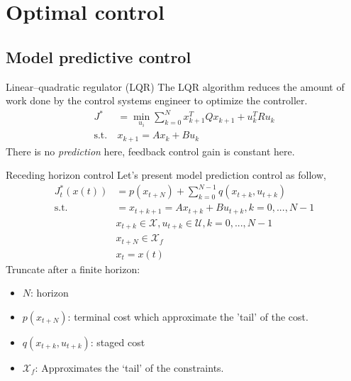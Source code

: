 \documentclass{beamer}
\begin{document}
\section{Optimal control}
\subsection{Model predictive control}
\begin{frame}{Linear–quadratic regulator (LQR)}
	The LQR algorithm reduces the amount of work done by the control systems engineer to optimize the controller.
	\begin{align*}
		J^* &= \min_{u_i} \sum_{k = 0}^{N} x_{k+1}^T Q x_{k+1} + u_k^T R u_k \\
		\text{s.t.} \ & x_{k+1} = A x_{k} + B u_{k}
	\end{align*}
	There is no \emph{prediction} here, feedback control gain is constant here.
\end{frame}


\begin{frame}{Receding horizon control}
	Let's present model prediction control as follow,
	\begin{align*}
		J_t^*(x(t)) &= p(x_{t+N}) + \sum_{k = 0}^{N-1} q(x_{t+k}, u_{t+k}) \\
		\text{s.t.} &= x_{t+k+1} = A x_{t+k} + B u_{t+k}, k = 0,...,N-1 \\
		& x_{t+k} \in \mathcal{X}, u_{t+k} \in \mathcal{U}, k = 0,...,N-1 \\
		& x_{t+N} \in \mathcal{X}_f \\
		& x_t = x(t)
	\end{align*}
	Truncate after a finite horizon:
	\begin{itemize}
		\item $N$: horizon
		\item $p(x_{t+N})$: terminal cost which approximate the 'tail' of the cost.
		\item $q(x_{t+k}, u_{t+k})$: staged cost
		\item $\mathcal{X}_f$: Approximates the ‘tail’ of the constraints.
	\end{itemize}
\end{frame}
\end{document}
